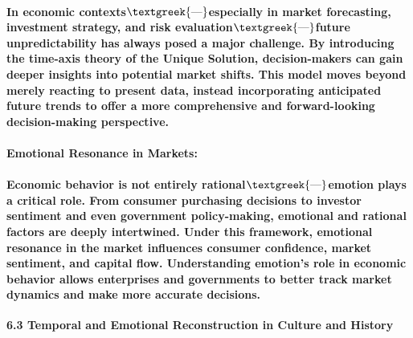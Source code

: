 \documentclass[a4paper]{article}
\begin{document}
\paragraph[In economic contexts$\text{\textgreek{—}}$especially in market forecasting, investment strategy, and risk
evaluation$\text{\textgreek{—}}$future unpredictability has always posed a major challenge. By introducing the
time{}-axis theory of the Unique Solution, decision{}-makers can gain deeper insights into potential market shifts.
This model moves beyond merely reacting to present data, instead incorporating anticipated future trends to offer a
more comprehensive and forward{}-looking decision{}-making perspective.]{In economic
contexts$\text{\textgreek{—}}$especially in market forecasting, investment strategy, and risk
evaluation$\text{\textgreek{—}}$\textbf{future unpredictability} has always posed a major challenge. By introducing the
time-axis theory of the Unique Solution, decision-makers can gain \textbf{deeper insights into potential market
shifts}. This model moves beyond merely reacting to present data, instead incorporating \textbf{anticipated future
trends} to offer a \textbf{more comprehensive and forward-looking decision-making perspective}.}
\paragraph[Emotional Resonance in Markets:]{\textbf{Emotional Resonance in Markets:}}
\paragraph[Economic behavior is not entirely rational$\text{\textgreek{—}}$emotion plays a critical role. From consumer
purchasing decisions to investor sentiment and even government policy{}-making, emotional and rational factors are
deeply intertwined. Under this framework, emotional resonance in the market influences consumer confidence, market
sentiment, and capital flow. Understanding emotion{}'s role in economic behavior allows enterprises and governments to
better track market dynamics and make more accurate decisions.]{Economic behavior is not entirely
rational$\text{\textgreek{—}}$\textbf{emotion plays a critical role}. From \textbf{consumer purchasing decisions} to
\textbf{investor sentiment} and even \textbf{government policy-making}, emotional and rational factors are deeply
intertwined. Under this framework, \textbf{emotional resonance in the market} influences consumer confidence, market
sentiment, and capital flow. Understanding emotion's role in economic behavior allows enterprises and governments to
\textbf{better track market dynamics} and make \textbf{more accurate decisions}.}
\textbf{6.3 Temporal and Emotional Reconstruction in Culture and History}
\end{document}

